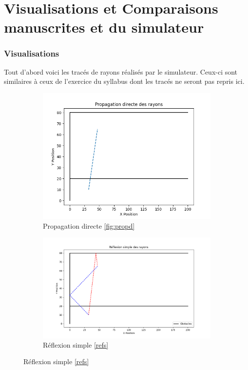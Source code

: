 \section{Visualisations et Comparaisons manuscrites et du simulateur}
\subsubsection{Visualisations}

Tout d'abord voici les tracés de rayons réalisés par le simulateur. Ceux-ci sont similaires à ceux de l'exercice du syllabus dont les tracés ne seront pas repris ici.
\begin{figure}[H]
\centering
\begin{subfigure}[b]{0.42\textwidth}
    \centering
    \includegraphics[width=\textwidth]{Pictures/propa_dir.png}
    \caption{Propagation directe \ref{fig:propd}}
    \label{fig:direct1}
\end{subfigure}
\hfill
\begin{subfigure}[b]{0.5\textwidth}
    \centering
    \includegraphics[width=\textwidth]{Pictures/simple_reflex.png}
    \caption{Réflexion simple \ref{refs}}
    \label{fig:simple_reflection}
\end{subfigure}


\end{figure}
